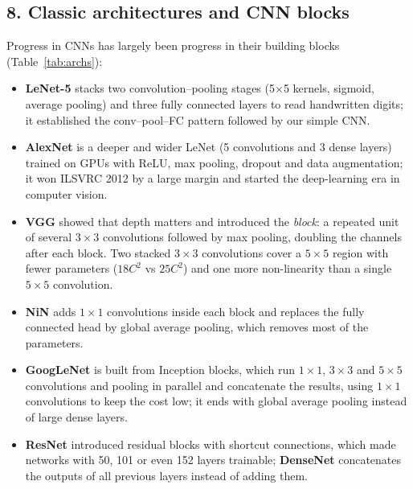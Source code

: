 \documentclass[12pt,letterpaper]{article}
\begin{document}
\subsection{8. Classic architectures and CNN blocks}
Progress in CNNs has largely been progress in their building blocks (Table~\ref{tab:archs}):
\begin{itemize}
  \item \textbf{LeNet-5} \cite{lecun1998} stacks two convolution--pooling stages (5$\times$5 kernels, sigmoid,
        average pooling) and three fully connected layers to read handwritten digits; it established the
        conv--pool--FC pattern followed by our simple CNN.
  \item \textbf{AlexNet} \cite{krizhevsky2012} is a deeper and wider LeNet (5 convolutions and 3 dense layers)
        trained on GPUs with ReLU, max pooling, dropout and data augmentation; it won ILSVRC 2012 by a large margin
        and started the deep-learning era in computer vision.
  \item \textbf{VGG} \cite{simonyan2015} showed that depth matters and introduced the \emph{block}: a repeated unit of
        several $3\times3$ convolutions followed by max pooling, doubling the channels after each block. Two stacked
        $3\times3$ convolutions cover a $5\times5$ region with fewer parameters ($18C^2$ vs $25C^2$) and one more
        non-linearity than a single $5\times5$ convolution.
  \item \textbf{NiN} \cite{lin2014} adds $1\times1$ convolutions inside each block and replaces the fully connected
        head by global average pooling, which removes most of the parameters.
  \item \textbf{GoogLeNet} \cite{szegedy2015} is built from Inception blocks, which run $1\times1$, $3\times3$ and
        $5\times5$ convolutions and pooling in parallel and concatenate the results, using $1\times1$ convolutions
        to keep the cost low; it ends with global average pooling instead of large dense layers.
  \item \textbf{ResNet} \cite{he2016} introduced residual blocks with shortcut connections, which made networks with
        50, 101 or even 152 layers trainable; \textbf{DenseNet} \cite{huang2017} concatenates the outputs of all
        previous layers instead of adding them.
\end{itemize}
\end{document}
